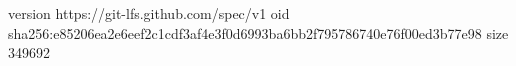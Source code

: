 version https://git-lfs.github.com/spec/v1
oid sha256:e85206ea2e6eef2c1cdf3af4e3f0d6993ba6bb2f795786740e76f00ed3b77e98
size 349692
